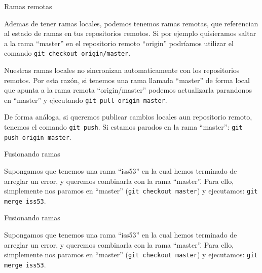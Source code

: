 \documentclass{beamer}
\begin{document}
\begin{frame}{Ramas remotas}

    Ademas de tener ramas locales, podemos tenemos ramas remotas, que referencian al estado de ramas en tus repositorios remotos.
    Si por ejemplo quisieramos saltar a la rama ``master'' en el repositorio remoto ``origin'' podríamos utilizar el comando \texttt{git checkout origin/master}.

    \vspace{1em}

    Nuestras ramas locales no sincronizan automaticamente con los repositorios remotos. Por esta razón, si tenemos una rama llamada ``master'' de forma local que
    apunta a la rama remota ``origin/master'' podemos actualizarla parandonos en ``master'' y ejecutando \texttt{git pull origin master}.

    \vspace{1em}

    De forma análoga, si queremos publicar cambios locales aun repositorio remoto, tenemos el comando \texttt{git push}. Si estamos parados en la rama ``master'':
    \texttt{git push origin master}.

\end{frame}

\begin{frame}{Fusionando ramas}

    Supongamos que tenemos una rama ``iss53'' en la cual hemos terminado de arreglar un error, y queremos combinarla con la rama ``master''.
    Para ello, simplemente nos paramos en ``master'' (\texttt{git checkout master}) y ejecutamos: \texttt{git merge iss53}.


\end{frame}

\begin{frame}{Fusionando ramas}

    Supongamos que tenemos una rama ``iss53'' en la cual hemos terminado de arreglar un error, y queremos combinarla con la rama ``master''.
    Para ello, simplemente nos paramos en ``master'' (\texttt{git checkout master}) y ejecutamos: \texttt{git merge iss53}.


\end{frame}
\end{document}
